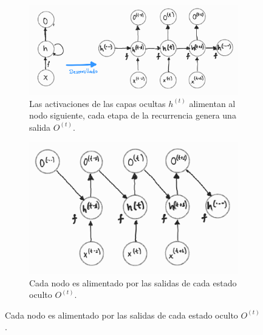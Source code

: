\begin{figure}[!ht]
    \centering
    \begin{subfigure}[b]{0.49\textwidth}
        \centering
        \includegraphics[width=\textwidth]{Chapters/1. Transformer/Figures/rnn/rnn_cfga.png}
        \caption{Las activaciones de las capas ocultas $h^{(t)}$
        alimentan al nodo siguiente, cada etapa de la recurrencia genera una salida $O^{(t)}$.}
        \label{fig:rnn_cfga}
    \end{subfigure}
    \hfill
    \begin{subfigure}[b]{0.4\textwidth}
        \centering
        \includegraphics[width=\textwidth]{Chapters/1. Transformer/Figures/rnn/rnn_cfgb.png}
        \caption{Cada nodo es alimentado por las salidas de cada estado oculto $O^{(t)}$.}
        \label{fig:rnn_cfgb}
    \end{subfigure}


\end{figure}
